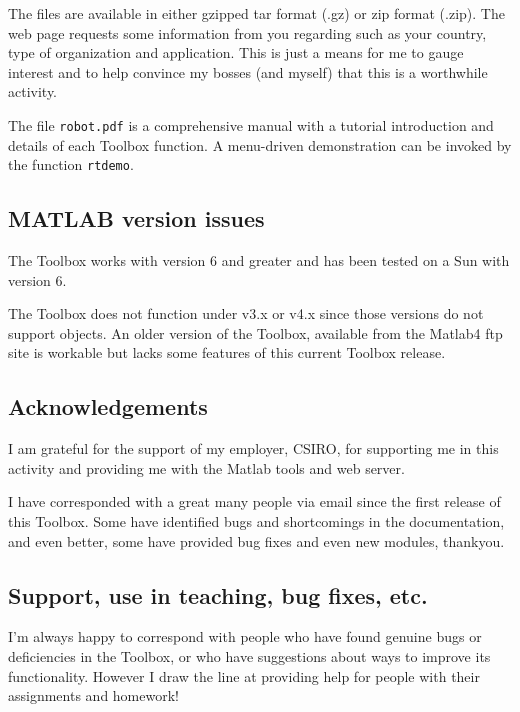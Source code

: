 \documentclass{article}
\begin{document}
The files are available in either gzipped tar format (.gz) or zip
format (.zip).  The web page requests some information from you
regarding such as your country, type of organization and application.
This is just a means for me to gauge interest and to help convince my
bosses (and myself) that this is a worthwhile activity.

The file {\tt robot.pdf} is a comprehensive manual with a tutorial introduction
and details of each Toolbox function.
A menu-driven demonstration can be invoked by the function {\tt rtdemo}.

\subsection{MATLAB version issues}
The Toolbox works with {\Mlab} version 6 and greater and has been tested 
on a Sun with version 6.

The Toolbox does not function under {\Mlab} v3.x or v4.x since those versions
do not support objects.  An older version of the Toolbox, available from
the Matlab4 ftp site is workable but lacks some features of this current
Toolbox release.


\subsection{Acknowledgements}
I am grateful for the support of my employer, CSIRO, for supporting me in
this activity and providing me with the Matlab tools and web server.

I have corresponded with a great many people via email since the first 
release of this Toolbox.  Some have identified bugs and shortcomings
in the documentation, and even better, some have provided bug fixes and
even new modules, thankyou.

\subsection{Support, use in teaching, bug fixes, etc.}
I'm always happy to correspond with people who have found genuine
bugs or deficiencies
in the Toolbox, or who have suggestions about ways to improve its
functionality.  However I draw the line at providing help for people
with their assignments and homework!
\end{document}
